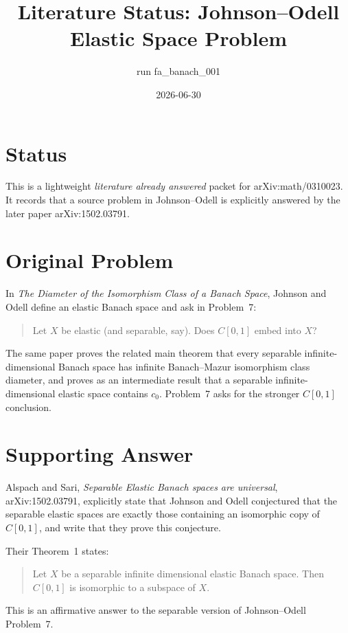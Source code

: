 \documentclass[11pt]{article}
\title{Literature Status: Johnson--Odell Elastic Space Problem}
\author{run fa\_banach\_001}
\date{2026-06-30}
\begin{document}
\maketitle

\section*{Status}

This is a lightweight \emph{literature already answered} packet for
arXiv:math/0310023. It records that a source problem in Johnson--Odell is
explicitly answered by the later paper arXiv:1502.03791.

\section*{Original Problem}

In \emph{The Diameter of the Isomorphism Class of a Banach Space},
Johnson and Odell define an elastic Banach space and ask in Problem~7:

\begin{quote}
Let \(X\) be elastic (and separable, say). Does \(C[0,1]\) embed into
\(X\)?
\end{quote}

The same paper proves the related main theorem that every separable
infinite-dimensional Banach space has infinite Banach--Mazur isomorphism
class diameter, and proves as an intermediate result that a separable
infinite-dimensional elastic space contains \(c_0\). Problem~7 asks for the
stronger \(C[0,1]\) conclusion.

\section*{Supporting Answer}

Alspach and Sari, \emph{Separable Elastic Banach spaces are universal},
arXiv:1502.03791, explicitly state that Johnson and Odell conjectured that
the separable elastic spaces are exactly those containing an isomorphic copy
of \(C[0,1]\), and write that they prove this conjecture.

Their Theorem~1 states:
\begin{quote}
Let \(X\) be a separable infinite dimensional elastic Banach space. Then
\(C[0,1]\) is isomorphic to a subspace of \(X\).
\end{quote}

This is an affirmative answer to the separable version of Johnson--Odell
Problem~7.
\end{document}
